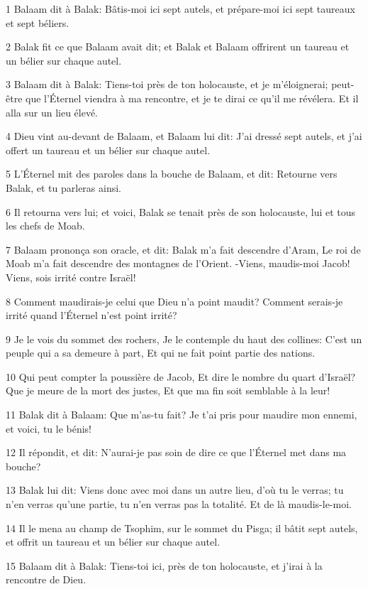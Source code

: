 \par 1 Balaam dit à Balak: Bâtis-moi ici sept autels, et prépare-moi ici sept taureaux et sept béliers.
\par 2 Balak fit ce que Balaam avait dit; et Balak et Balaam offrirent un taureau et un bélier sur chaque autel.
\par 3 Balaam dit à Balak: Tiens-toi près de ton holocauste, et je m'éloignerai; peut-être que l'Éternel viendra à ma rencontre, et je te dirai ce qu'il me révélera. Et il alla sur un lieu élevé.
\par 4 Dieu vint au-devant de Balaam, et Balaam lui dit: J'ai dressé sept autels, et j'ai offert un taureau et un bélier sur chaque autel.
\par 5 L'Éternel mit des paroles dans la bouche de Balaam, et dit: Retourne vers Balak, et tu parleras ainsi.
\par 6 Il retourna vers lui; et voici, Balak se tenait près de son holocauste, lui et tous les chefs de Moab.
\par 7 Balaam prononça son oracle, et dit: Balak m'a fait descendre d'Aram, Le roi de Moab m'a fait descendre des montagnes de l'Orient. -Viens, maudis-moi Jacob! Viens, sois irrité contre Israël!
\par 8 Comment maudirais-je celui que Dieu n'a point maudit? Comment serais-je irrité quand l'Éternel n'est point irrité?
\par 9 Je le vois du sommet des rochers, Je le contemple du haut des collines: C'est un peuple qui a sa demeure à part, Et qui ne fait point partie des nations.
\par 10 Qui peut compter la poussière de Jacob, Et dire le nombre du quart d'Israël? Que je meure de la mort des justes, Et que ma fin soit semblable à la leur!
\par 11 Balak dit à Balaam: Que m'as-tu fait? Je t'ai pris pour maudire mon ennemi, et voici, tu le bénis!
\par 12 Il répondit, et dit: N'aurai-je pas soin de dire ce que l'Éternel met dans ma bouche?
\par 13 Balak lui dit: Viens donc avec moi dans un autre lieu, d'où tu le verras; tu n'en verras qu'une partie, tu n'en verras pas la totalité. Et de là maudis-le-moi.
\par 14 Il le mena au champ de Tsophim, sur le sommet du Pisga; il bâtit sept autels, et offrit un taureau et un bélier sur chaque autel.
\par 15 Balaam dit à Balak: Tiens-toi ici, près de ton holocauste, et j'irai à la rencontre de Dieu.
